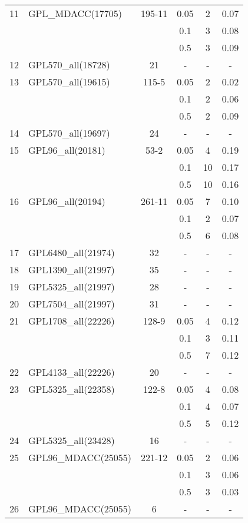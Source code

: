 \documentclass[12pt]{article}
\begin{document}
\begin{longtable}{c|l|cccc}
  11 & GPL\_MDACC(17705) & 195-11 & 0.05 & 2 & 0.07 \\
                        & & & 0.1 &3 &0.08  \\
  & & & 0.5 &3 & 0.09 \\ \hline
  12 & GPL570\_all(18728) & 21 &- & - & -\\
  \hline
  13 & GPL570\_all(19615) & 115-5 & 0.05 &2 & 0.02 \\
                        & & & 0.1 &2 &0.06  \\
  & & & 0.5 &2 & 0.09 \\ \hline
  14 & GPL570\_all(19697) & 24 & - & -&- \\
  \hline
  15 & GPL96\_all(20181) & 53-2 & 0.05 & 4 & 0.19\\
                        & & & 0.1 & 10 & 0.17 \\
  & & & 0.5 &10 & 0.16 \\ \hline
  16 & GPL96\_all(20194) & 261-11 & 0.05 & 7 & 0.10\\
                        & & & 0.1 &2 &0.07  \\
  & & & 0.5 & 6 & 0.08 \\ \hline
  17 & GPL6480\_all(21974) & 32 & - & -&- \\
  \hline
  18 & GPL1390\_all(21997) & 35 & - & -&- \\
  \hline
  19 & GPL5325\_all(21997) & 28 & - & -&- \\
  \hline
  20 & GPL7504\_all(21997) & 31 &- & -&- \\
  \hline
  21 & GPL1708\_all(22226) & 128-9 & 0.05 & 4 & 0.12 \\
                        & & & 0.1 &3 &0.11  \\
  & & & 0.5 & 7 & 0.12  \\ \hline
  22 & GPL4133\_all(22226) & 20 & - & - &- \\
  \hline
  23 & GPL5325\_all(22358) & 122-8 & 0.05 & 4 & 0.08 \\
                        & & & 0.1 & 4& 0.07 \\
  & & & 0.5 & 5 & 0.12 \\ \hline
  24 & GPL5325\_all(23428) & 16 & - & -&- \\
  \hline
  25 & GPL96\_MDACC(25055) & 221-12 & 0.05 & 2 & 0.06 \\
                        & & & 0.1 & 3 & 0.06 \\
  & & & 0.5 & 3 & 0.03  \\ \hline
  26 & GPL96\_MDACC(25055) & 6 & - & -&- \\

\end{longtable}
\end{document}
